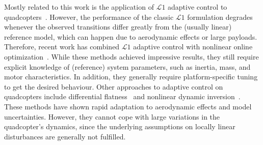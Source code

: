 Mostly related to this work is the application of $\mathcal{L}1$ adaptive control to quadcopters~\cite{schreier2012modeling}.
%
However, the performance of the classic $\mathcal{L}1$ formulation degrades whenever the observed transitions differ greatly from the (usually linear) reference model, which can happen due to aerodynamic effects or large payloads.
%
Therefore, recent work has combined $\mathcal{L}1$ adaptive control with nonlinear online optimization~\cite{hanover2021performance, pravitra2020, pereida2018adaptive}.
%
While these methods achieved impressive results, they still require explicit knowledge of (reference) system parameters, such as inertia, mass, and motor characteristics.
%
In addition, they generally require platform-specific tuning to get the desired behaviour. 
%
Other approaches to adaptive control on quadcopters include differential flatness~\cite{faessler2017differential} and nonlinear dynamic inversion~\cite{smeur2016adaptive}.
%
These methods have shown rapid adaptation to aerodynamic effects and model uncertainties.
%
However, they cannot cope with large variations in the quadcopter's dynamics, since the underlying assumptions on locally linear disturbances are generally not fulfilled.
 


%

 
